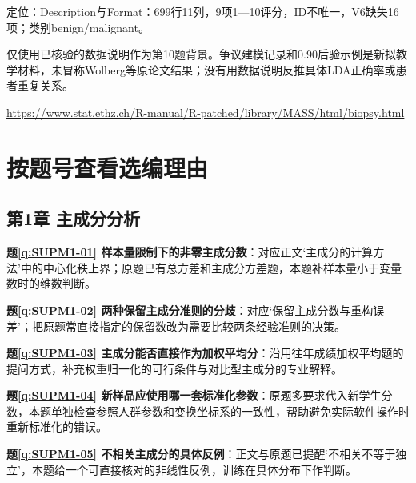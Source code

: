 \par\noindent\begin{minipage}{\linewidth}\label{src:MASS-BIOPSY}
\par
定位：Description与Format：699行11列，9项1—10评分，ID不唯一，V6缺失16项；类别benign/malignant。\par
仅使用已核验的数据说明作为第10题背景。争议建模记录和0.90后验示例是新拟教学材料，未冒称Wolberg等原论文结果；没有用数据说明反推具体LDA正确率或患者重复关系。\par
{\small\url{https://www.stat.ethz.ch/R-manual/R-patched/library/MASS/html/biopsy.html}}\par
\end{minipage}\par\medskip

\section*{按题号查看选编理由}\begingroup\small\setlength{\parskip}{2pt}
\subsection*{第1章 主成分分析}

\noindent\textbf{题\ref*{q:SUPM1-01} 样本量限制下的非零主成分数}：对应正文‘主成分的计算方法’中的中心化秩上界；原题已有总方差和主成分方差题，本题补样本量小于变量数时的维数判断。\par

\noindent\textbf{题\ref*{q:SUPM1-02} 两种保留主成分准则的分歧}：对应‘保留主成分数与重构误差’；把原题常直接指定的保留数改为需要比较两条经验准则的决策。\par

\noindent\textbf{题\ref*{q:SUPM1-03} 主成分能否直接作为加权平均分}：沿用往年成绩加权平均题的提问方式，补充权重归一化的可行条件与对比型主成分的专业解释。\par

\noindent\textbf{题\ref*{q:SUPM1-04} 新样品应使用哪一套标准化参数}：原题多要求代入新学生分数，本题单独检查参照人群参数和变换坐标系的一致性，帮助避免实际软件操作时重新标准化的错误。\par

\noindent\textbf{题\ref*{q:SUPM1-05} 不相关主成分的具体反例}：正文与原题已提醒‘不相关不等于独立’，本题给一个可直接核对的非线性反例，训练在具体分布下作判断。\par

